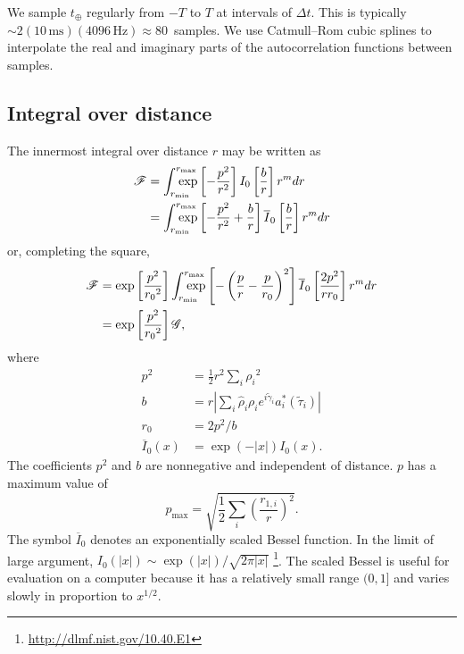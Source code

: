 \documentclass[amsmath,amssymb,aps,prx,reprint,nopreprintnumbers,nofootinbib]{revtex4-1}
\def\mathrlap{\mathpalette\mathrlapinternal}
\def\mathrlapinternal#1#2{\rlap{$\mathsurround=0pt#1{#2}$}}
\begin{document}
We sample $t_\oplus$ regularly from $-T$ to $T$ at intervals of $\Delta t$. This is typically $\sim 2 (10\,\mathrm{ms})(4096\,\mathrm{Hz}) \approx 80$~samples. We use Catmull\nobreakdashes--Rom cubic splines to interpolate the real and imaginary parts of the autocorrelation functions between samples.

\subsection{Integral over distance}

The innermost integral over distance $r$ may be written as
%
\begin{align}\label{eq:distance-integral}
    \mathscr{F} &=
        \int_{\mathrlap{r_\mathrm{min}}}^{\mathrlap{r_\mathrm{max}}}
        \exp\left[-\frac{p^2}{r^2}\right]
        I_0\left[\frac{b}{r}\right] r^m dr \nonumber \\
    &=
        \int_{\mathrlap{r_\mathrm{min}}}^{\mathrlap{r_\mathrm{max}}}
        \exp\left[-\frac{p^2}{r^2}+\frac{b}{r}\right]
        \overline{I}_0\left[\frac{b}{r}\right] r^m dr
\end{align}
%
or, completing the square,
%
\begin{align}
    \mathscr{F} &= \exp\left[\frac{p^2}{{r_0}^2}\right]
        \int_{\mathrlap{r_\mathrm{min}}}^{\mathrlap{r_\mathrm{max}}}
        \exp\left[-\left(\frac{p}{r} - \frac{p}{r_0}\right)^2\right]
        \overline{I}_0\left[\frac{2p^2}{r r_0}\right] r^m dr \\
    &= \exp\left[\frac{p^2}{{r_0}^2}\right] \mathscr{G},
\end{align}
%
where
%
\begin{align}
    p^2 &= \frac{1}{2} r^2 \sum_i {\rho_i}^2 \label{eq:likelihood-p-factor} \\
    b &= r \left| \sum_i \hat\rho_i \rho_i e^{i \tilde{\gamma}_i}
        a_i^*(\tilde{\tau}_i) \right| \label{eq:likelihood-b-factor} \\
    r_0 &= 2 p^2 / b \\
    \overline{I}_0(x) &= \exp(-|x|) I_0(x).
\end{align}
%
The coefficients $p^2$ and $b$ are nonnegative and independent of distance. $p$ has a maximum value of
%
\begin{equation}
    p_\mathrm{max} = \sqrt{\frac{1}{2} \sum_i \left(\frac{r_{1,i}}{r}\right)^2}.
\end{equation}
%
The symbol $\overline{I}_0$ denotes an exponentially scaled Bessel function. In the limit of large argument, $I_0(|x|) \sim \exp(|x|) / \sqrt{2 \pi |x|}$ \citep{Olver:2010:NHMF,NIST:DLMF}\footnote{\url{http://dlmf.nist.gov/10.40.E1}}. The scaled Bessel is useful for evaluation on a computer because it has a relatively small range $(0, 1]$ and varies slowly in proportion to $x^{1/2}$.
\end{document}
